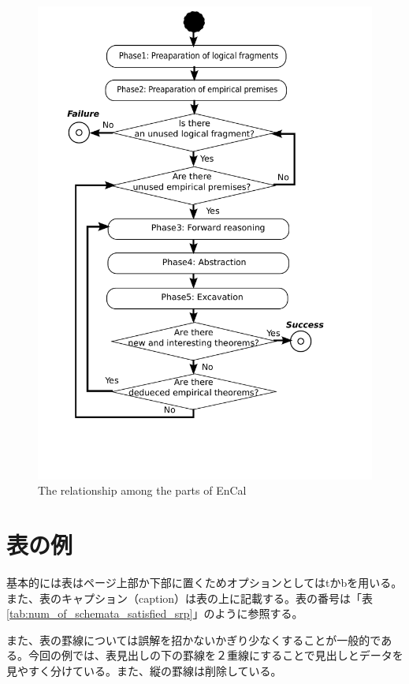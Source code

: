 \documentclass[a4paper, 12pt]{ltjreport}
\begin{document}
 \begin{figure}[tb]
   \centering
     \includegraphics[scale=0.6]{fig/reasoning_engine.pdf}
     \caption{The relationship among the parts of EnCal}
     \label{fig:reasoning_engine}
 \end{figure}

 \section{表の例}
 
 基本的には表はページ上部か下部に置くためオプションとしてはtかbを用いる。また、表のキャプション（caption）は表の上に記載する。表の番号は「表\ref{tab:num_of_schemata_satisfied_srp}」のように参照する。

また、表の罫線については誤解を招かないかぎり少なくすることが一般的である。今回の例では、表見出しの下の罫線を２重線にすることで見出しとデータを見やすく分けている。また、縦の罫線は削除している。
 
\end{document}
